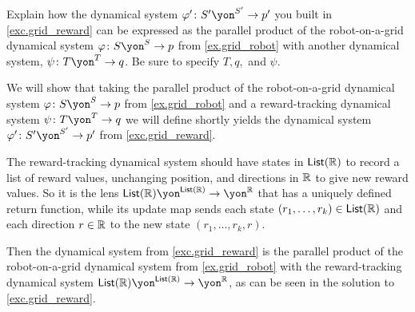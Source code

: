 \documentclass[Book-Poly]{subfiles}
\begin{document}
\begin{exercise} \label{exc.grid_reward_par}
Explain how the dynamical system $\varphi'\colon S'\yon^{S'}\to p'$ you built in \cref{exc.grid_reward} can be expressed as the parallel product of the robot-on-a-grid dynamical system $\varphi\colon S\yon^S\to p$ from \cref{ex.grid_robot} with another dynamical system, $\psi\colon T\yon^T\to q$.
Be sure to specify $T, q,$ and $\psi$.
\begin{solution}
We will show that taking the parallel product of the robot-on-a-grid dynamical system $\varphi\colon S\yon^S\to p$ from \cref{ex.grid_robot} and a reward-tracking dynamical system $\psi\colon T\yon^T\to q$ we will define shortly yields the dynamical system $\varphi'\colon S'\yon^{S'}\to p'$ from \cref{exc.grid_reward}.

The reward-tracking dynamical system should have states in $\mathsf{List}(\mathbb{R})$ to record a list of reward values, unchanging position, and directions in $\mathbb{R}$ to give new reward values.
So it is the lens $\lst(\rr)\yon^{\lst(\rr)}\to\yon^\rr$ that has a uniquely defined return function, while its update map sends each state $(r_1,\ldots,r_k)\in\mathsf{List}(\mathbb{R})$ and each direction $r\in\mathbb{R}$ to the new state $(r_1,\ldots,r_k,r)$.

Then the dynamical system from \cref{exc.grid_reward} is the parallel product of the robot-on-a-grid dynamical system from \cref{ex.grid_robot} with the reward-tracking dynamical system $\lst(\rr)\yon^{\lst(\rr)}\to\yon^\rr$, as can be seen in the solution to \cref{exc.grid_reward}.
\end{solution}
\end{exercise}
\end{document}
